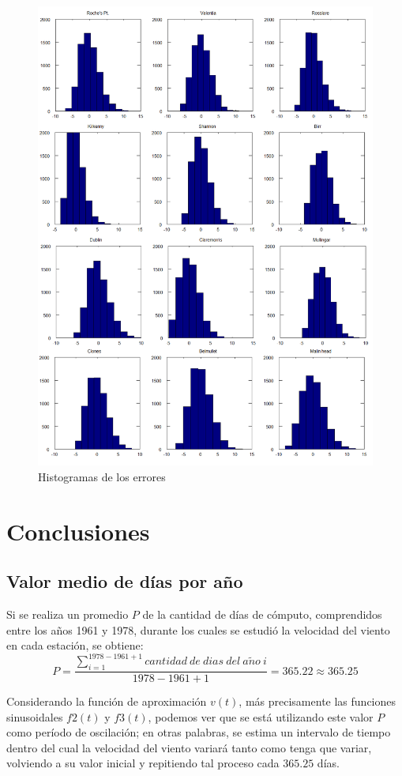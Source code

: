 \documentclass[journal, monochrome]{IEEEtran}
\begin{document}
\begin{figure}[hbp]
	\centering
	\includegraphics[scale = 0.35]{img/histo.png}
	\caption{Histogramas de los errores}
	\label{figure:histograms}
\end{figure}


\vspace{1cm}
\section{Conclusiones}
\label{section:conclusions}
\vspace{0.5cm}
\subsection{Valor medio de días por año}
Si se realiza un promedio $P$ de la cantidad de días de cómputo, comprendidos entre los años 1961 y 1978, durante los cuales se estudió la velocidad del viento en cada estación, se obtiene:
\begin{equation}
 P = \frac{\displaystyle\sum_{i=1}^{1978-1961+1} cantidad \: de \: dias \: del \: a\tilde{n}o \: i}{1978-1961+1} = 365.22 \approx 365.25
\end{equation}
\par
Considerando la función de aproximación $v(t)$, más precisamente las funciones sinusoidales $f2(t)$ y $f3(t)$, podemos ver que se está utilizando
este valor $P$ como período de oscilación; en otras palabras, se estima un intervalo de tiempo dentro del cual la velocidad del viento variará tanto
como tenga que variar, volviendo a su valor inicial y repitiendo tal proceso cada $365.25$ días.
\end{document}
